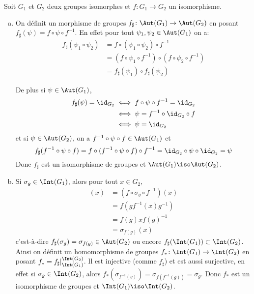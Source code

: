 Soit $G_1$ et $G_2$ deux groupes isomorphes et $f\colon G_1\to G_2$ un
isomorphisme.
%
\begin{enumerate}[a)]
\item On définit un morphisme de groupes $f_\sharp\colon\Aut(G_1)\to\Aut(G_2)$
en posant $f_\sharp(\psi) = f\circ\psi\circ f^{-1}$. En effet pour tout
$\psi_1,\psi_2\in\Aut(G_1)$ on a:
%
\begin{align*}
f_\sharp(\psi_1\circ\psi_2) &= f\circ(\psi_1\circ\psi_2)\circ f^{-1} \\
  &= (f\circ\psi_1\circ f^{-1})\circ(f\circ\psi_2\circ f^{-1}) \\
  &= f_\sharp(\psi_1)\circ f_\sharp(\psi_2)
\end{align*}

De plus si $\psi\in\Aut(G_1)$,
%
\begin{align*}
f_\sharp(\psi) = \id_{G_2} 
  &\iff f\circ\psi\circ f^{-1} = \id_{G_2} \\
  &\iff \psi = f^{-1}\circ\id_{G_2}\circ f \\
  &\iff \psi = \id_{G_2}
\end{align*}
%
et si $\psi\in\Aut(G_2)$, on a $f^{-1}\circ\psi\circ f\in\Aut(G_1)$ et
\[
  f_\sharp(f^{-1}\circ\psi\circ f) = f\circ(f^{-1}\circ\psi\circ f)\circ
  f^{-1} = \id_{G_2}\circ\psi\circ\id_{G_2} = \psi
\]
Donc $f_\sharp$ est un isomorphisme de groupes et $\Aut(G_1)\iso\Aut(G_2)$.

\item Si $\sigma_g\in\Int(G_1)$, alors pour tout $x\in G_2$,
%
\begin{align*}
[f_\sharp(\sigma_g)](x)& = (f\circ\sigma_g\circ f^{-1})(x) \\
  & = f(gf^{-1}(x)g^{-1}) \\
  & = f(g)xf(g)^{-1} \\
  & = \sigma_{f(g)}(x)
\end{align*}
%
c'est-à-dire $f_\sharp(\sigma_g) = \sigma_{f(g)}\in\Aut(G_2)$ ou encore
$f_\sharp(\Int(G_1))\subset\Int(G_2)$. Ainsi on définit un homomorphisme de
groupes $f_*\colon\Int(G_1)\to\Int(G_2)$ en posant 
$f_* = f_\sharp\vert^{\Int(G_2)}_{\Int(G_1)}$. Il est injective (comme
$f_\sharp$) et est aussi surjective, en effet si $\sigma_g\in\Int(G_2)$, alors
$f_*(\sigma_{f^{-1}(g)}) = \sigma_{f(f^{-1}(g))} = \sigma_g$. Donc $f_*$ est
un isomorphisme de groupes et $\Int(G_1)\iso\Int(G_2)$.
\end{enumerate}
